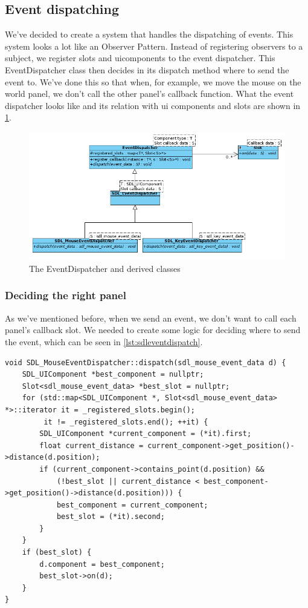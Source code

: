 \subsection{Event dispatching}
\label{sec:eventdispatch}
We've decided to create a system that handles the dispatching of events. This 
system looks a lot like an Observer Pattern. Instead of registering observers 
to a subject, we register slots and uicomponents to the event dispatcher.
This EventDispatcher class then decides in its dispatch method where to send 
the event to. We've done this so that when, for example, we move the mouse 
on the world panel, we don't call the other panel's callback function.
What the event dispatcher looks like and its relation with ui components and 
slots are shown in \cref{fig:eventdispatcher}.

\begin{figure}[H]
\centering
\includegraphics[scale=0.6]{res/events/eventdispatch.png}
\caption{The EventDispatcher and derived classes}\label{fig:eventdispatcher}
\end{figure}

\subsubsection{Deciding the right panel}
\label{sec:eventdispatcher-dispatch}
As we've mentioned before, when we send an event, we don't want to call each 
panel's callback slot. We needed to create some logic for deciding where to 
send the event, which can be seen in \cref{lst:sdleventdispatch}.
\\

\begin{lstlisting}[caption={SDL\_MouseEventDispatcher dispatch method.},
label={lst:sdleventdispatch}]
void SDL_MouseEventDispatcher::dispatch(sdl_mouse_event_data d) {
    SDL_UIComponent *best_component = nullptr;
    Slot<sdl_mouse_event_data> *best_slot = nullptr;
    for (std::map<SDL_UIComponent *, Slot<sdl_mouse_event_data> *>::iterator it = _registered_slots.begin();
         it != _registered_slots.end(); ++it) {
        SDL_UIComponent *current_component = (*it).first;
        float current_distance = current_component->get_position()->distance(d.position);
        if (current_component->contains_point(d.position) &&
            (!best_slot || current_distance < best_component->get_position()->distance(d.position))) {
            best_component = current_component;
            best_slot = (*it).second;
        }
    }
    if (best_slot) {
        d.component = best_component;
        best_slot->on(d);
    }
}
\end{lstlisting}
